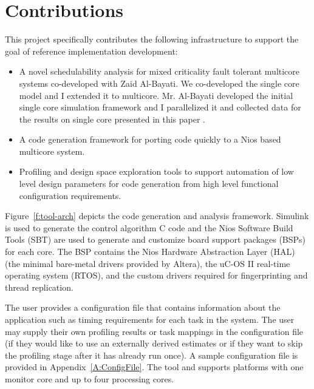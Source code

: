 	
\section{Contributions}

	This project specifically contributes the following infrastructure to support the goal of reference implementation development:
	\begin{itemize}
	  \item A novel schedulability analysis for mixed criticality fault tolerant multicore systems co-developed with Zaid Al-Bayati. 
	  We co-developed the single core model and I extended it to multicore. 
	  Mr. Al-Bayati developed the initial single core simulation framework and I parallelized it and collected data for the results on single core presented in this paper \cite{albayati2016modes}.
	  \item A code generation framework for porting code quickly to a Nios based multicore system.
	  \item Profiling and design space exploration tools to support automation of low level design parameters for code generation from high level functional configuration requirements.
	\end{itemize}
	
		Figure~\ref{f:tool-arch} depicts the code generation and analysis framework. 
	Simulink is used to generate the control algorithm C code and the Nios Software Build Tools (SBT) are used to generate and customize board support packages (BSPs) for each core. 
	The BSP contains the Nios Hardware Abstraction Layer (HAL) (the minimal bare-metal drivers provided by Altera), the uC-OS II real-time operating system (RTOS), and the custom drivers required for fingerprinting and thread replication. 

 
	The user provides a configuration file that contains information about the application such as timing requirements for each task in the system. 
	The user may supply their own profiling results or task mappings in the configuration file (if they would like to use an externally derived estimates or if they want to skip the profiling stage after it has already run once). 
	A sample configuration file is provided in Appendix~\ref{A:ConfigFile}. 
	The tool and supports platforms with one monitor core and up to four processing cores.


